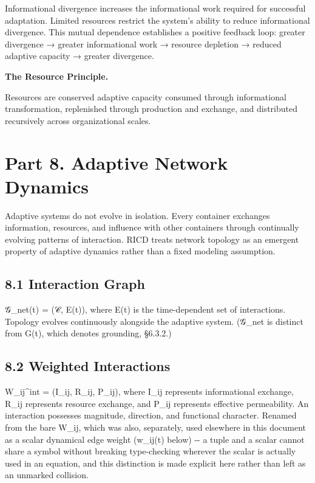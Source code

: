 \documentclass[
]{article}
\begin{document}
Informational divergence increases the informational work required for
successful adaptation. Limited resources restrict the system's ability
to reduce informational divergence. This mutual dependence establishes a
positive feedback loop: greater divergence → greater informational work
→ resource depletion → reduced adaptive capacity → greater divergence.

\textbf{The Resource Principle.}

Resources are conserved adaptive capacity consumed through informational
transformation, replenished through production and exchange, and
distributed recursively across organizational scales.

\hypertarget{part-8.-adaptive-network-dynamics}{%
\section{Part 8. Adaptive Network
Dynamics}\label{part-8.-adaptive-network-dynamics}}

Adaptive systems do not evolve in isolation. Every container exchanges
information, resources, and influence with other containers through
continually evolving patterns of interaction. RICD treats network
topology as an emergent property of adaptive dynamics rather than a
fixed modeling assumption.

\hypertarget{interaction-graph}{%
\subsection{8.1 Interaction Graph}\label{interaction-graph}}

𝒢\_net(t) = (𝒞, E(t)), where E(t) is the time-dependent set of
interactions. Topology evolves continuously alongside the adaptive
system. (𝒢\_net is distinct from G(t), which denotes grounding, §6.3.2.)

\hypertarget{weighted-interactions}{%
\subsection{8.2 Weighted Interactions}\label{weighted-interactions}}

W\_ij\^{}int = (I\_ij, R\_ij, P\_ij), where I\_ij represents
informational exchange, R\_ij represents resource exchange, and P\_ij
represents effective permeability. An interaction possesses magnitude,
direction, and functional character. Renamed from the bare W\_ij, which
was also, separately, used elsewhere in this document as a scalar
dynamical edge weight (w\_ij(t) below) -\/- a tuple and a scalar cannot
share a symbol without breaking type-checking wherever the scalar is
actually used in an equation, and this distinction is made explicit here
rather than left as an unmarked collision.
\end{document}
